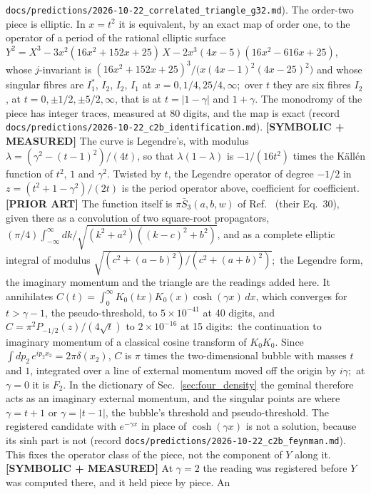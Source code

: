 \documentclass[aps,pra,twocolumn,superscriptaddress,longbibliography]{revtex4-2}
\begin{document}
\texttt{docs/predictions/2026-10-22\_correlated\_triangle\_g32.md}).  The order-two piece is elliptic.  In
$x=t^2$ it is equivalent, by an exact map of order one, to the operator of a
period of the rational elliptic surface
$Y^2=X^3-3x^2(16x^2+152x+25)\,X-2x^3(4x-5)(16x^2-616x+25)$, whose
$j$-invariant is $(16x^2+152x+25)^3/\bigl(x(4x-1)^2(4x-25)^2\bigr)$ and whose
singular fibres are $I_1^*$, $I_2$, $I_2$, $I_1$ at $x=0,1/4,25/4,\infty$;\ over
$t$ they are six fibres $I_2$, at $t=0,\pm1/2,\pm5/2,\infty$, that is at
$t=|1-\gamma|$ and $1+\gamma$.  The monodromy of the piece has integer traces,
measured at 80 digits, and the map is exact (record
\texttt{docs/predictions/2026-10-22\_c2b\_identification.md}).
\textbf{[SYMBOLIC + MEASURED]} The curve is Legendre's, with modulus
$\lambda=(\gamma^2-(t-1)^2)/(4t)$, so that $\lambda(1-\lambda)$ is
$-1/(16t^2)$ times the K\"all\'en function of $t^2$, $1$ and $\gamma^2$.
Twisted by $t$, the Legendre operator of degree $-1/2$ in
$z=(t^2+1-\gamma^2)/(2t)$ is the period operator above, coefficient for
coefficient.  \textbf{[PRIOR ART]} The function itself is
$\pi\bar S_3(a,b,w)$ of Ref.~\cite{bbbg2008} (their Eq.~30), given there
as a convolution of two square-root propagators,
$(\pi/4)\int_{-\infty}^{\infty}dk/\sqrt{(k^2+a^2)((k-c)^2+b^2)}$, and as a
complete elliptic integral of modulus
$\sqrt{(c^2+(a-b)^2)/(c^2+(a+b)^2)}$;\ the Legendre form, the imaginary
momentum and the triangle are the readings added here.  It annihilates
$C(t)=\int_0^\infty K_0(tx)K_0(x)\cosh(\gamma x)\,dx$, which converges for
$t>\gamma-1$, the pseudo-threshold, to $5\times10^{-41}$ at 40 digits, and $C=\pi^2P_{-1/2}(z)/(4\sqrt t)$ to $2\times10^{-16}$ at
15 digits:\ the continuation to imaginary momentum of a classical cosine
transform of $K_0K_0$.  Since $\int dp_2\,e^{ip_2x_2}=2\pi\delta(x_2)$,
$C$ is $\pi$ times the two-dimensional bubble with masses $t$ and $1$,
integrated over a line of external momentum moved off the origin by
$i\gamma$;\ at $\gamma=0$ it is $F_2$.  In the dictionary of
Sec.~\ref{sec:four_density} the geminal therefore acts as an imaginary
external momentum, and the singular points are where $\gamma=t+1$ or
$\gamma=|t-1|$, the bubble's threshold and pseudo-threshold.  The
registered candidate with $e^{-\gamma x}$ in place of $\cosh(\gamma x)$
is not a solution, because its sinh part is not (record
\texttt{docs/predictions/2026-10-22\_c2b\_feynman.md}).  This fixes the
operator class of the piece, not the component of $Y$ along it.
\textbf{[SYMBOLIC + MEASURED]} At $\gamma=2$ the reading was registered
before $Y$ was computed there, and it held piece by piece.  An
\end{document}
